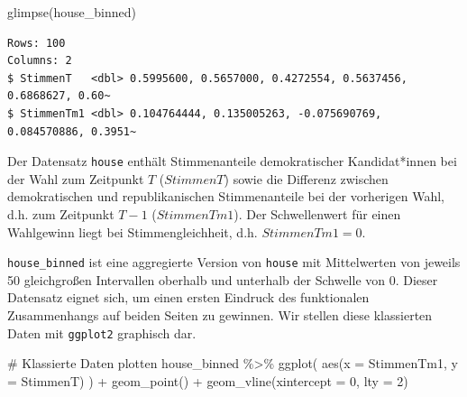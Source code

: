 \documentclass[
  a4paper,
  DIV=11,
  oneside]{scrreprt}
\newenvironment{Shaded}{\begin{snugshade}}{\end{snugshade}}
\newcommand{\AttributeTok}[1]{\textcolor[rgb]{0.40,0.45,0.13}{#1}}
\newcommand{\CommentTok}[1]{\textcolor[rgb]{0.37,0.37,0.37}{#1}}
\newcommand{\DecValTok}[1]{\textcolor[rgb]{0.68,0.00,0.00}{#1}}
\newcommand{\FunctionTok}[1]{\textcolor[rgb]{0.28,0.35,0.67}{#1}}
\newcommand{\NormalTok}[1]{\textcolor[rgb]{0.00,0.23,0.31}{#1}}
\newcommand{\SpecialCharTok}[1]{\textcolor[rgb]{0.37,0.37,0.37}{#1}}
\begin{document}
\begin{Shaded}
\begin{Highlighting}[]
\FunctionTok{glimpse}\NormalTok{(house\_binned)}
\end{Highlighting}
\end{Shaded}

\begin{verbatim}
Rows: 100
Columns: 2
$ StimmenT   <dbl> 0.5995600, 0.5657000, 0.4272554, 0.5637456, 0.6868627, 0.60~
$ StimmenTm1 <dbl> 0.104764444, 0.135005263, -0.075690769, 0.084570886, 0.3951~
\end{verbatim}

Der Datensatz \texttt{house} enthält Stimmenanteile demokratischer
Kandidat*innen bei der Wahl zum Zeitpunkt \(T\) (\(StimmenT\)) sowie die
Differenz zwischen demokratischen und republikanischen Stimmenanteile
bei der vorherigen Wahl, d.h. zum Zeitpunkt \(T-1\) (\(StimmenTm1\)).
Der Schwellenwert für einen Wahlgewinn liegt bei Stimmengleichheit, d.h.
\(StimmenTm1 = 0\).

\texttt{house\_binned} ist eine aggregierte Version von \texttt{house}
mit Mittelwerten von jeweils 50 gleichgroßen Intervallen oberhalb und
unterhalb der Schwelle von 0. Dieser Datensatz eignet sich, um einen
ersten Eindruck des funktionalen Zusammenhangs auf beiden Seiten zu
gewinnen. Wir stellen diese klassierten Daten mit \texttt{ggplot2}
graphisch dar.

\begin{Shaded}
\begin{Highlighting}[]
\CommentTok{\# Klassierte Daten plotten}
\NormalTok{house\_binned }\SpecialCharTok{\%\textgreater{}\%}
  \FunctionTok{ggplot}\NormalTok{(}
    \FunctionTok{aes}\NormalTok{(}\AttributeTok{x =}\NormalTok{ StimmenTm1, }\AttributeTok{y =}\NormalTok{ StimmenT)}
\NormalTok{    ) }\SpecialCharTok{+}
  \FunctionTok{geom\_point}\NormalTok{() }\SpecialCharTok{+}
  \FunctionTok{geom\_vline}\NormalTok{(}\AttributeTok{xintercept =} \DecValTok{0}\NormalTok{, }\AttributeTok{lty =} \DecValTok{2}\NormalTok{)}
\end{Highlighting}
\end{Shaded}
\end{document}
